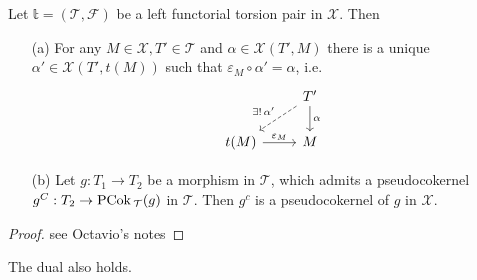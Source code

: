 \begin{rmk}
  Let $\mathbb{t}=(\mathcal{T},\mathcal{F})$ be a left functorial torsion pair in $\mathcal{X}$.
  Then
  \begin{enumerate}
    \item[(a)] For any $M\in\mathcal{X}, T'\in\mathcal{T}$ and $\alpha\in\mathcal{X}(T',M)$ there
    is a unique $\alpha'\in\mathcal{X}(T',t(M))$ such that $\varepsilon_M\circ\alpha'=\alpha$, i.e.
    \begin{equation*}
      \begin{tikzcd}
        & T'\arrow[dashed]{ld}[']{\exists!\,\alpha'}\arrow{d}{\alpha}\\
        t(M)\arrow{r}{\varepsilon_M}&M
      \end{tikzcd}
    \end{equation*}
    \item[(b)] Let $g:T_1\to T_2$ be a morphism in $\mathcal{T}$, which admits a pseudocokernel
    $g^C:T_2\to\mathrm{\textup{PCok\,}}_\mathcal{T}(g)$ in $\mathcal{T}$. Then $g^c$ is a pseudocokernel of $g$
    in $\mathcal{X}$.
  \end{enumerate}
\end{rmk}

\begin{proof}
  see Octavio's notes
\end{proof}

The dual also holds.
